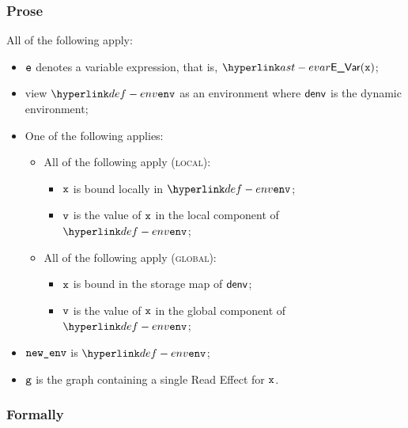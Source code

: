 \subsubsection{Prose}
All of the following apply:
\begin{itemize}
  \item $\ve$ denotes a variable expression, that is, $\EVar(\vx)$;
  \item view $\env$ as an environment where $\denv$ is the dynamic environment;
  \item One of the following applies:
  \begin{itemize}
    \item All of the following apply (\textsc{local}):
    \begin{itemize}
      \item $\vx$ is bound locally in $\env$;
      \item $\vv$ is the value of $\vx$ in the local component of $\env$;
    \end{itemize}

    \item All of the following apply (\textsc{global}):
    \begin{itemize}
      \item $\vx$ is bound in the storage map of $\denv$;
      \item $\vv$ is the value of $\vx$ in the global component of $\env$;
    \end{itemize}
  \end{itemize}
  \item $\newenv$ is $\env$;
  \item $\vg$ is the graph containing a single Read Effect for $\vx$.
\end{itemize}

\subsubsection{Formally}
\begin{mathpar}
\end{mathpar}

\begin{mathpar}
\end{mathpar}

